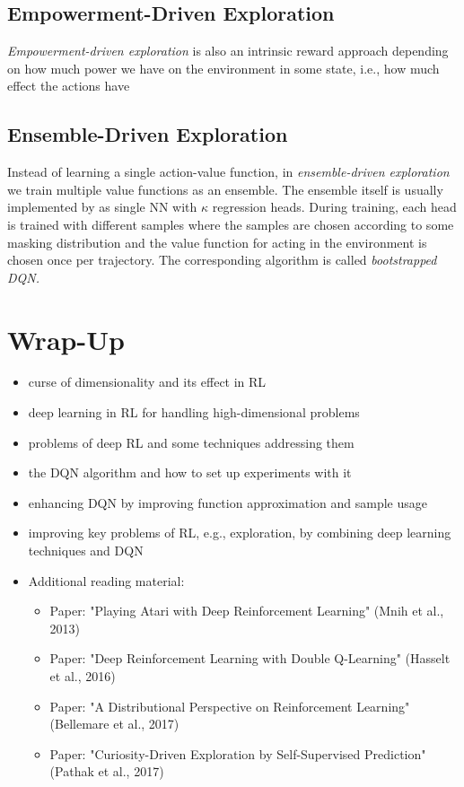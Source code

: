 		\subsection{Empowerment-Driven Exploration}
			\emph{Empowerment-driven exploration} is also an intrinsic reward approach depending on how much power we have on the environment in some state, i.e., how much effect the actions have

		\subsection{Ensemble-Driven Exploration}
			Instead of learning a single action-value function, in \emph{ensemble-driven exploration} we train multiple value functions as an ensemble. The ensemble itself is usually implemented by as single \ac{NN} with \(\kappa\) regression heads. During training, each head is trained with different samples where the samples are chosen according to some masking distribution and the value function for acting in the environment is chosen once per trajectory. The corresponding algorithm is called \emph{bootstrapped \ac{DQN}.}

	\section{Wrap-Up}
		\begin{itemize}
			\item curse of dimensionality and its effect in \ac{RL}
			\item deep learning in \ac{RL} for handling high-dimensional problems
			\item problems of deep \ac{RL} and some techniques addressing them
			\item the \ac{DQN} algorithm and how to set up experiments with it
			\item enhancing \ac{DQN} by improving function approximation and sample usage
			\item improving key problems of \ac{RL}, e.g., exploration, by combining deep learning techniques and \ac{DQN}
			\item Additional reading material:
				\begin{itemize}
					\item Paper: "Playing Atari with Deep Reinforcement Learning" (Mnih et al., 2013)  %
					\item Paper: "Deep Reinforcement Learning with Double Q-Learning" (Hasselt et al., 2016)  %
					\item Paper: "A Distributional Perspective on Reinforcement Learning" (Bellemare et al., 2017)  %
					\item Paper: "Curiosity-Driven Exploration by Self-Supervised Prediction" (Pathak et al., 2017)  %
				\end{itemize}
		\end{itemize}

